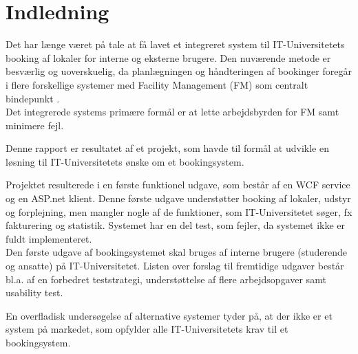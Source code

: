 \chapter{Indledning}
\label{Intro}
Det har længe været på tale at få lavet et integreret system til IT-Universitetets booking af lokaler for interne og eksterne brugere. Den nuværende metode er besværlig og uoverskuelig, da planlægningen og håndteringen af bookinger foregår i flere forskellige systemer med Facility Management (FM) som centralt bindepunkt \cite[Kap. A]{kravspec}.
\\Det integrerede systems primære formål er at lette arbejdsbyrden for FM samt minimere fejl. 

Denne rapport er resultatet af et projekt, som havde til formål at udvikle en løsning til IT-Universitetets ønske om et bookingsystem.

Projektet resulterede i en første funktionel udgave, som består af en WCF service og en ASP.net klient. Denne første udgave understøtter booking af lokaler, udstyr og forplejning, men mangler nogle af de funktioner, som IT-Universitetet søger, fx fakturering og statistik. Systemet har en del test, som fejler, da systemet ikke er fuldt implementeret.
\\Den første udgave af bookingsystemet skal bruges af interne brugere (studerende og ansatte) på IT-Universitetet. Listen over forslag til fremtidige udgaver består bl.a. af en forbedret teststrategi, understøttelse af flere arbejdsopgaver samt usability test.

En overfladisk undersøgelse af alternative systemer tyder på, at der ikke er et system på markedet, som opfylder alle IT-Universitetets krav til et bookingsystem.